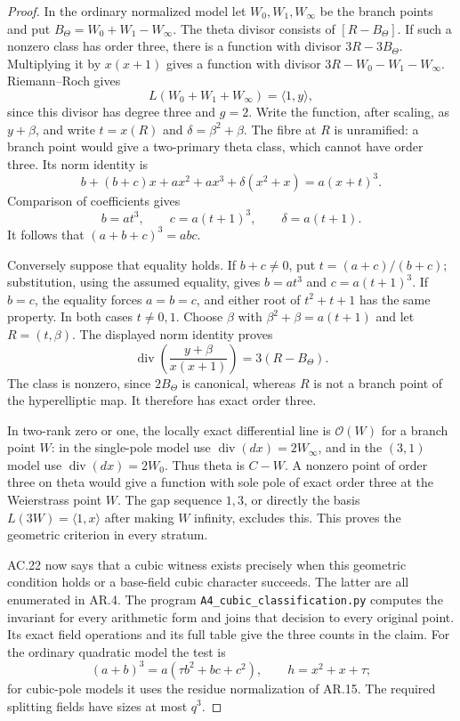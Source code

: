 \begin{proof}
In the ordinary normalized model let $W_0,W_1,W_\infty$ be
the branch points and put $B_\Theta=W_0+W_1-W_\infty$.
The theta divisor consists of $[R-B_\Theta]$. If such a nonzero
class has order three, there is a function with divisor
$3R-3B_\Theta$. Multiplying it by $x(x+1)$ gives a function
with divisor $3R-W_0-W_1-W_\infty$. Riemann--Roch gives
\[
 L(W_0+W_1+W_\infty)=\langle1,y\rangle,
\]
since this divisor has degree three and $g=2$.
Write the function, after scaling, as $y+\beta$, and write
$t=x(R)$ and $\delta=\beta^2+\beta$. The fibre at $R$ is
unramified: a branch point would give a two-primary theta
class, which cannot have order three. Its norm identity is
\[
 b+(b+c)x+ax^2+ax^3+\delta(x^2+x)=a(x+t)^3.
\]
Comparison of coefficients gives
\[
 b=at^3,\qquad c=a(t+1)^3,\qquad \delta=a(t+1).
\]
It follows that $(a+b+c)^3=abc$.

Conversely suppose that equality holds. If $b+c\ne0$, put
$t=(a+c)/(b+c)$; substitution, using the assumed equality,
gives $b=at^3$ and $c=a(t+1)^3$. If $b=c$, the equality forces
$a=b=c$, and either root of $t^2+t+1$ has the same property.
In both cases $t\ne0,1$. Choose $\beta$ with
$\beta^2+\beta=a(t+1)$ and let $R=(t,\beta)$.
The displayed norm identity proves
\[
 \operatorname{div}\left(\frac{y+\beta}{x(x+1)}\right)
                      =3(R-B_\Theta).
\]
The class is nonzero, since $2B_\Theta$ is canonical, whereas
$R$ is not a branch point of the hyperelliptic map. It therefore
has exact order three.

In two-rank zero or one, the locally exact differential line is
$\mathcal O(W)$ for a branch point $W$: in the single-pole model
use $\operatorname{div}(dx)=2W_\infty$, and in the $(3,1)$
model use $\operatorname{div}(dx)=2W_0$.
Thus theta is $C-W$. A nonzero point of order three on theta
would give a function with sole pole of exact order three at
the Weierstrass point $W$. The gap sequence $1,3$, or directly
the basis $L(3W)=\langle1,x\rangle$ after making $W$ infinity,
excludes this. This proves the geometric criterion in every stratum.

AC.22 now says that a cubic witness exists precisely when this
geometric condition holds or a base-field cubic character succeeds.
The latter are all enumerated in AR.4. The program
\texttt{A4\_cubic\_classification.py} computes the invariant
for every arithmetic form and joins that decision to every
original point. Its exact field operations and its full table
give the three counts in the claim. For the ordinary quadratic
model the test is
\[
 (a+b)^3=a(\tau b^2+bc+c^2),\qquad h=x^2+x+\tau;
\]
for cubic-pole models it uses the residue normalization of AR.15.
The required splitting fields have sizes at most $q^3$.


\end{proof}
